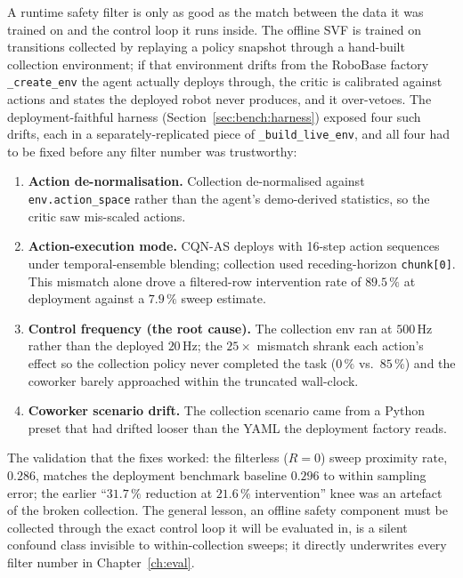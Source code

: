 \documentclass[11pt,a4paper]{report}
\newcommand{\cqnas}{CQN-AS}
\begin{document}
A runtime safety filter is only as good as the match between the data
it was trained on and the control loop it runs inside. The offline SVF
is trained on transitions collected by replaying a policy snapshot
through a hand-built collection environment; if that environment drifts
from the RoboBase factory \texttt{\_create\_env} the agent actually
deploys through, the critic is calibrated against actions and states
the deployed robot never produces, and it over-vetoes. The
deployment-faithful harness (Section~\ref{sec:bench:harness}) exposed
four such drifts, each in a separately-replicated piece of
\texttt{\_build\_live\_env}, and all four had to be fixed before any
filter number was trustworthy:

\begin{enumerate}[topsep=2pt,itemsep=2pt]
\item \textbf{Action de-normalisation.} Collection de-normalised
  against \texttt{env.action\_space} rather than the agent's
  demo-derived statistics, so the critic saw mis-scaled actions.
\item \textbf{Action-execution mode.} \cqnas{} deploys with
  16-step action sequences under temporal-ensemble blending;
  collection used receding-horizon \texttt{chunk[0]}. This mismatch
  alone drove a filtered-row intervention rate of $89.5\,\%$ at
  deployment against a $7.9\,\%$ sweep estimate.
\item \textbf{Control frequency (the root cause).} The collection
  env ran at $500$\,Hz rather than the deployed $20$\,Hz; the
  $25\times$ mismatch shrank each action's effect so the collection
  policy never completed the task ($0\,\%$ vs.\ $85\,\%$) and the
  coworker barely approached within the truncated wall-clock.
\item \textbf{Coworker scenario drift.} The collection scenario came
  from a Python preset that had drifted looser than the YAML the
  deployment factory reads.
\end{enumerate}

The validation that the fixes worked: the filterless ($R = 0$) sweep
proximity rate, $0.286$, matches the deployment benchmark baseline
$0.296$ to within sampling error; the earlier ``$31.7\,\%$ reduction
at $21.6\,\%$ intervention'' knee was an artefact of the broken
collection. The general lesson, an offline safety component must be
collected through the exact control loop it will be evaluated in,
is a silent confound class invisible to within-collection sweeps; it
directly underwrites every filter number in Chapter~\ref{ch:eval}.
\end{document}
